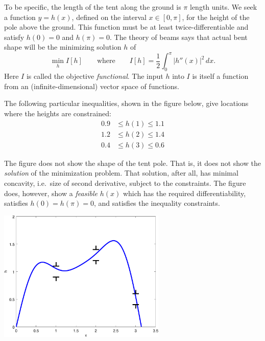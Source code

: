 \documentclass[11pt]{amsart}
\begin{document}
\begin{enumerate}
To be specific, the length of the tent along the ground is $\pi$ length units.  We seek a function $y=h(x)$, defined on the interval $x\in[0,\pi]$, for the height of the pole above the ground.  This function must be at least twice-differentiable and satisfy $h(0)=0$ and $h(\pi)=0$.  The theory of beams says that actual bent shape will be the minimizing solution $h$ of
    $$\min_h I[h] \qquad \text{where} \qquad I[h] = \frac{1}{2} \int_0^\pi |h''(x)|^2\,dx.$$
Here $I$ is called the objective \emph{functional}.  The input $h$ into $I$ is itself a function from an (infinite-dimensional) vector space of functions.

The following particular inequalities, shown in the figure below, give locations where the heights are constrained:
\begin{align*}
0.9 &\le h(1) \le 1.1 \\
1.2 &\le h(2) \le 1.4 \\
0.4 &\le h(3) \le 0.6
\end{align*}

The figure does not show the shape of the tent pole.  That is, it does not show the \emph{solution} of the minimization problem.  That solution, after all, has minimal concavity, i.e.~size of second derivative, subject to the constraints.  The figure does, however, show a \emph{feasible} $h(x)$ which has the required differentiability, satisfies $h(0)=h(\pi)=0$, and satisfies the inequality constraints.

\bigskip
\begin{center}
\includegraphics[width=0.6\textwidth]{beamgates}
\end{center}

\end{enumerate}
\end{document}
